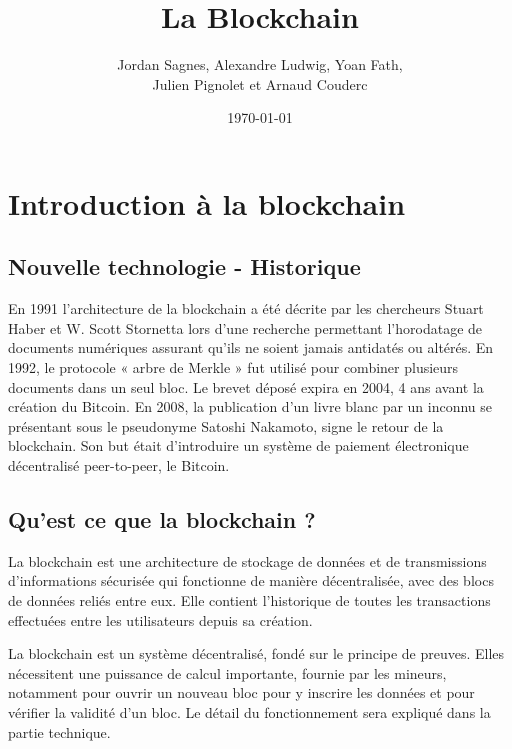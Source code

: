 \documentclass[12pt, a4paper, oneside]{book}
\title{La Blockchain}
\author{ Jordan Sagnes, Alexandre Ludwig, Yoan Fath, \\ Julien Pignolet et Arnaud Couderc}
\date{\today}
\begin{document}
 
\maketitle
 
    \frontmatter
    
    \tableofcontents
 
    \mainmatter

    \chapter{Introduction à la blockchain}
    \section{Nouvelle technologie - Historique}
    En 1991 l’architecture de la blockchain a été décrite par les chercheurs Stuart Haber et W. Scott Stornetta lors d’une recherche permettant l’horodatage de documents numériques assurant qu’ils ne soient jamais antidatés ou altérés. 
En 1992, le protocole « arbre de Merkle » fut utilisé pour combiner plusieurs documents dans un seul bloc. 
Le brevet déposé expira en 2004, 4 ans avant la création du Bitcoin.
En 2008, la publication d’un livre blanc par un inconnu se présentant sous le pseudonyme Satoshi Nakamoto, signe le retour de la blockchain. Son but était d’introduire un système de paiement électronique décentralisé peer-to-peer, le Bitcoin.
    \section{Qu'est ce que la blockchain ?}
    La blockchain est une architecture de stockage de données et de transmissions d’informations sécurisée qui fonctionne de manière décentralisée, avec des blocs de données reliés entre eux. Elle contient l’historique de toutes les transactions effectuées entre les utilisateurs depuis sa création. 

La blockchain est un système décentralisé, fondé sur le principe de preuves. Elles nécessitent une puissance de calcul importante, fournie par les mineurs, notamment pour ouvrir un nouveau bloc pour y inscrire les données et pour vérifier la validité d’un bloc. Le détail du fonctionnement sera expliqué dans la partie technique.
\end{document}
